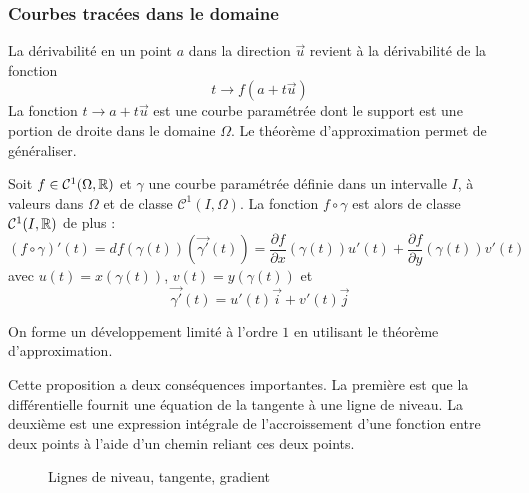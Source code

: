 \subsubsection{Courbes tracées dans le domaine}
La dérivabilité en un point $a$ dans la direction $\overrightarrow u$ revient à la dérivabilité de la fonction
\begin{displaymath}
 t \rightarrow f(a+t\overrightarrow u)
\end{displaymath}
La fonction $t\rightarrow a+t \overrightarrow u $ est une courbe paramétrée dont le support est une portion de droite dans le domaine $\Omega$. Le théorème d'approximation permet de généraliser.
\begin{prop}
 Soit $f\in \mathcal C^1(\Omega,\mathbb{R})$ et $\gamma$ une courbe paramétrée définie dans un intervalle $I$, à valeurs dans $\Omega$ et de classe $\mathcal C^1(I,\Omega)$. La fonction $f\circ \gamma$ est alors de classe  $\mathcal C^1(I,\mathbb{R})$ de plus :
\begin{displaymath}
 \left(f\circ \gamma \right)'(t)
= df(\gamma(t))\left( \overrightarrow{\gamma '}(t)\right)
= \dfrac{\partial f}{\partial x}(\gamma(t))u'(t) + \dfrac{\partial f}{\partial y}(\gamma(t))v'(t) 
\end{displaymath}
avec $u(t)=x(\gamma(t))$,  $v(t)=y(\gamma(t))$ et
\begin{displaymath}
 \overrightarrow{\gamma '}(t) = u'(t)\overrightarrow i + v'(t)\overrightarrow j
\end{displaymath}
\end{prop}
\begin{demo}
 On forme un développement limité à l'ordre $1$ en utilisant le théorème d'approximation.
\end{demo}
Cette proposition a deux conséquences importantes. La première est que la différentielle fournit une équation de la tangente à une ligne de niveau. La deuxième est une expression intégrale de l'accroissement d'une fonction entre deux points à l'aide d'un chemin reliant ces deux points.
\begin{figure}[ht]
 \centering

\caption{Lignes de niveau, tangente, gradient}
\label{fig:C2268_2}
\end{figure}

